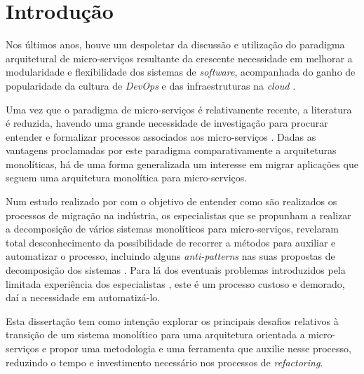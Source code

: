 \chapter{Introdução}

    Nos últimos anos, houve um despoletar da discussão e utilização do paradigma arquitetural de micro-serviços resultante da crescente necessidade em melhorar a modularidade e flexibilidade dos sistemas de \textit{software}, acompanhada do ganho de popularidade da cultura  de \textit{DevOps} e das infraestruturas na \textit{cloud} \citep{most_prominent_areas_of_research_ms_hamzehloui}. 
    
    Uma vez que o paradigma de micro-serviços é relativamente recente, a literatura é reduzida, havendo uma grande necessidade de investigação para procurar entender e formalizar processos associados aos micro-serviços \citep{most_prominent_areas_of_research_ms_hamzehloui}. 
    Dadas as vantagens proclamadas por este paradigma comparativamente a arquiteturas monolíticas, há de uma forma generalizada um interesse em migrar aplicações que seguem uma arquitetura monolítica para micro-serviços.
    
    Num estudo realizado por \cite{fritzsch19_migration_in_industry} com o objetivo de entender como são realizados os processos de migração na indústria, os especialistas que se propunham a realizar a decomposição de vários sistemas monolíticos para micro-serviços, revelaram total desconhecimento da possibilidade de recorrer a métodos para auxiliar e automatizar o processo, incluindo alguns \textit{anti-patterns} nas suas propostas de decomposição dos sistemas \citep{pahl16_ms_systematic_mapping}. Para lá dos eventuais problemas introduzidos pela limitada experiência dos especialistas \citep{pahl16_ms_systematic_mapping}, este é um processo custoso e demorado, daí a necessidade em automatizá-lo.
    
    Esta dissertação tem como intenção explorar os principais desafios relativos à transição de um sistema monolítico para uma arquitetura orientada a micro-serviços e propor uma metodologia e uma ferramenta que auxilie nesse processo, reduzindo o tempo e investimento necessário nos processos de \textit{refactoring}.
    
    
    
